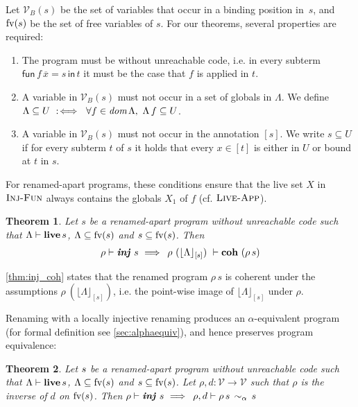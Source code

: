 \documentclass[openright,a4paper,11pt]{scrartcl}
\newcommand{\slist}[1]{\ensuremath{\overline{#1}}}
\newcommand{\impl}{\ensuremath{\Longrightarrow\,}}
\newcommand{\indu}[1]{\ensuremath{\textbf{\textit{#1}}}}
\newcommand{\dom}{\ensuremath{\textup{\textit{dom\,}}}}
\newcommand{\incl}{\ensuremath{\subseteq}}
\newcommand{\nrule}[1]{\ensuremath{\textup{\textsc{#1}}}}
\newcommand{\Var}{\ensuremath{\mathcal{V}}}
\newcommand{\fv}{\ensuremath{\textup{fv}}}
\newcommand{\ilIn}{\textsf{in}}
\newcommand{\ilLetRec}[4]{\textsf{fun}\,#1\,#2=#3\,\ilIn\,#4}
\newcommand{\freenam}[1]{\ensuremath{\fv(#1)}}
\newcommand{\LT}{\ensuremath{\Lambda}}
\newcommand{\LC}{\ensuremath{\Lambda}}
\newcommand{\lv}{\ensuremath{X}}
\newcommand{\coh}[3]{\ensuremath{#1~\vdash\textbf{\textup{coh}}~{}#3}}
\newcommand{\restrict}[2]{\ensuremath{\lfloor#1\rfloor_{#2}}}
\newcommand{\livesA}[3]{\ensuremath{#1\vdash\textbf{\textup{live}}\,{}#3}}
\newcommand{\ri}[3]{\ensuremath{#1\vdash\indu{inj}~#3}}
\newcommand{\myref}[1]{\autoref{#1}}
\newcommand{\alphai}[4]{\ensuremath{#1,#2\vdash#3 \,\sim_\alpha\, #4}}
\newcommand{\rmp}{\ensuremath{\rho}}
\newcommand{\rmpp}{\ensuremath{d}}
\theoremstyle{plain}
\newtheorem{theorem}{Theorem}
\theoremstyle{plain}
\theoremstyle{plain}
\theoremstyle{plain}
\theoremstyle{nonumberplain}
\begin{document}
Let $\Var_B(s)$ be the set of variables that occur in a binding position in~$s$, and \freenam{s} be the set of free variables of $s$.
For our theorems, several properties are required:
\begin{enumerate}[label=(\arabic*)]
\item The program must be without unreachable code, i.e.
in every subterm $\ilLetRec{f}{\slist{x}}{s}{t}$ it must be the case that $f$ is applied in $t$.
\item A variable in $\Var_B(s)$ must not occur in a set of globals in $\LT$.
We define $\LT\incl{U}~:\!\iff~\forall {f}\in\dom\LT,~\LT\,f\incl{U}$.
\item A variable in $\Var_B(s)$ must not occur in the annotation $[s]$.
We write $s\incl{U}$ if for every subterm $t$ of $s$ it holds that every $x\in[t]$ is either
in $U$ or bound at $t$ in $s$.
\end{enumerate}
For renamed-apart programs, these conditions ensure that the live set $X$ in \nrule{Inj-Fun} always contains the globals $X_1$ of $f$ (cf. \nrule{Live-App}).

\begin{theorem}
\label{thm:inj_coh}
Let $s$ be a renamed-apart program without unreachable code such that $\livesA{\LC}{\lv}{s}$,
$\LC\incl\freenam{s}$ and $s\incl\freenam{s}$. Then
\begin{align*}
\ri{\rho}{a}{s}
~\impl~\coh{\rho~(\restrict{\LC}{[s]})}{\rho\,a}{(\rho\,s)}
\end{align*}
\end{theorem}
\myref{thm:inj_coh} states that the renamed program $\rho\,s$ is coherent under the assumptions $\rho~(\restrict{\LC}{[s]})$, i.e. the point-wise image of $\restrict{\LC}{[s]}$ under $\rho$.


Renaming with a locally injective renaming produces an $\alpha$-equivalent program (for formal definition see \myref{sec:alphaequiv}), and hence preserves program equivalence:


\begin{theorem}
\label{thm:inj_alpha}
Let $s$ be a renamed-apart program without unreachable code such that $\livesA{\LC}{a}{\sterm}$, $\LC\incl\freenam{s}$ and $s\incl\freenam{s}$.
Let $\rmp,\rmpp:\Var\to\Var$ such that $\rmp$ is the inverse of $\rmpp$ on $\freenam{s}$. Then
$\ri{\rho}{a}{\sterm}~\impl~\alphai{\rmp}{\rmpp}{\rho\,\sterm}{\sterm}$
\end{theorem}
\end{document}
